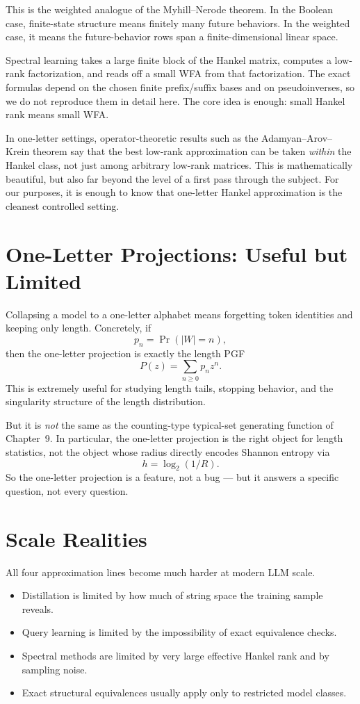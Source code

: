 This is the weighted analogue of the Myhill--Nerode theorem. In the Boolean case, finite-state structure means finitely many future behaviors. In the weighted case, it means the future-behavior rows span a finite-dimensional linear space.

Spectral learning takes a large finite block of the Hankel matrix, computes a low-rank factorization, and reads off a small WFA from that factorization. The exact formulas depend on the chosen finite prefix/suffix bases and on pseudoinverses, so we do not reproduce them in detail here. The core idea is enough: small Hankel rank means small WFA.

In one-letter settings, operator-theoretic results such as the Adamyan--Arov--Krein theorem say that the best low-rank approximation can be taken \emph{within} the Hankel class, not just among arbitrary low-rank matrices. This is mathematically beautiful, but also far beyond the level of a first pass through the subject. For our purposes, it is enough to know that one-letter Hankel approximation is the cleanest controlled setting.

\section{One-Letter Projections: Useful but Limited}

Collapsing a model to a one-letter alphabet means forgetting token identities and keeping only length. Concretely, if
\[
  p_n = \Pr(|W|=n),
\]
then the one-letter projection is exactly the length PGF
\[
  P(z) = \sum_{n \ge 0} p_n z^n.
\]
This is extremely useful for studying length tails, stopping behavior, and the singularity structure of the length distribution.

But it is \emph{not} the same as the counting-type typical-set generating function of Chapter~9. In particular, the one-letter projection is the right object for length statistics, not the object whose radius directly encodes Shannon entropy via
\[
  h = \log_2(1/R).
\]
So the one-letter projection is a feature, not a bug --- but it answers a specific question, not every question.

\section{Scale Realities}

All four approximation lines become much harder at modern LLM scale.

\begin{itemize}
  \item Distillation is limited by how much of string space the training sample reveals.
  \item Query learning is limited by the impossibility of exact equivalence checks.
  \item Spectral methods are limited by very large effective Hankel rank and by sampling noise.
  \item Exact structural equivalences usually apply only to restricted model classes.
\end{itemize}

